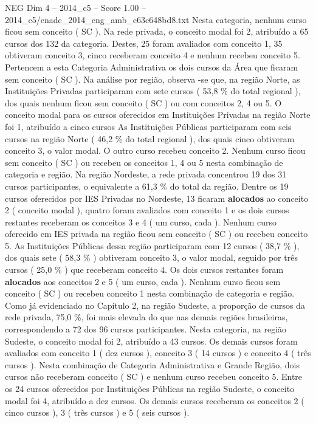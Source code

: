 \begin{textsample}{NEG Dim 4 – 2014\_c5 – Score 1.00 – 2014\_c5/enade\_2014\_eng\_amb\_c63c648bd8.txt}
Nesta categoria, nenhum curso ficou sem conceito ( SC ).
Na rede privada, o conceito modal foi 2, atribuído a 65 cursos dos 132 da categoria.
Destes, 25 foram avaliados com conceito 1, 35 obtiveram conceito 3, cinco receberam conceito 4 e nenhum recebeu conceito 5.
Pertencem a esta Categoria Administrativa os dois cursos da Área que ficaram sem conceito ( SC ).
Na análise por região, observa -se que, na região Norte, as Instituições Privadas participaram com sete cursos ( 53,8 \% do total regional ), dos quais nenhum ficou sem conceito ( SC ) ou com conceitos 2, 4 ou 5.
O conceito modal para os cursos oferecidos em Instituições Privadas na região Norte foi 1, atribuído a cinco cursos As Instituições Públicas participaram com seis cursos na região Norte ( 46,2 \% do total regional ), dos quais cinco obtiveram conceito 3, o valor modal.
O outro curso recebeu conceito 2.
Nenhum curso ficou sem conceito ( SC ) ou recebeu os conceitos 1, 4 ou 5 nesta combinação de categoria e região.
Na região Nordeste, a rede privada concentrou 19 dos 31 cursos participantes, o equivalente a 61,3 \% do total da região.
Dentre os 19 cursos oferecidos por IES Privadas no Nordeste, 13 ficaram \textbf{alocados} ao conceito 2 ( conceito modal ), quatro foram avaliados com conceito 1 e os dois cursos restantes receberam os conceitos 3 e 4 ( um curso, cada ).
Nenhum curso oferecido em IES privada na região ficou sem conceito ( SC ) ou recebeu conceito 5.
As Instituições Públicas dessa região participaram com 12 cursos ( 38,7 \% ), dos quais sete ( 58,3 \% ) obtiveram conceito 3, o valor modal, seguido por três cursos ( 25,0 \% ) que receberam conceito 4.
Os dois cursos restantes foram \textbf{alocados} aos conceitos 2 e 5 ( um curso, cada ).
Nenhum curso ficou sem conceito ( SC ) ou recebeu conceito 1 nesta combinação de categoria e região.
Como já evidenciado no Capítulo 2, na região Sudeste, a proporção de cursos da rede privada, 75,0 \%, foi mais elevada do que nas demais regiões brasileiras, correspondendo a 72 dos 96 cursos participantes.
Nesta categoria, na região Sudeste, o conceito modal foi 2, atribuído a 43 cursos.
Os demais cursos foram avaliados com conceito 1 ( dez cursos ), conceito 3 ( 14 cursos ) e conceito 4 ( três cursos ).
Nesta combinação de Categoria Administrativa e Grande Região, dois cursos não receberam conceito ( SC ) e nenhum curso recebeu conceito 5.
Entre os 24 cursos oferecidos por Instituições Públicas na região Sudeste, o conceito modal foi 4, atribuído a dez cursos.
Os demais cursos receberam os conceitos 2 ( cinco cursos ), 3 ( três cursos ) e 5 ( seis cursos ).

\end{textsample}
